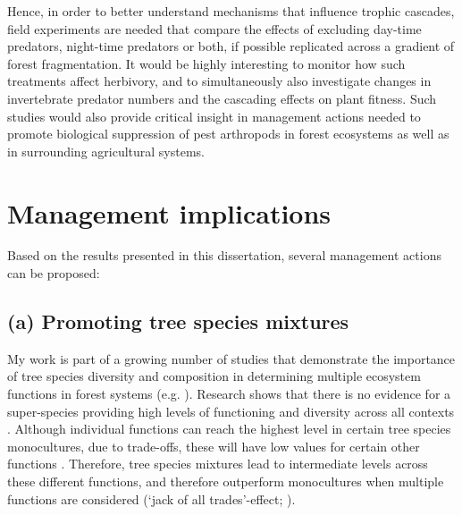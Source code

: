 \documentclass[10pt, twoside]{book} %
\begin{document}
Hence, in order to better understand mechanisms that influence trophic cascades, field experiments are needed that compare the effects of excluding day-time predators, night-time predators or both, if possible replicated across a gradient of forest fragmentation. It would be highly interesting to monitor how such treatments affect herbivory, and to simultaneously  also investigate changes in invertebrate predator numbers and the cascading effects on plant fitness. Such studies would also provide critical insight in management actions needed to promote biological suppression of pest arthropods in forest ecosystems as well as in surrounding agricultural systems.\\


	\section{Management implications}
	
	Based on the results presented in this dissertation, several management actions can be proposed:\\
	\subsection*{(a) Promoting tree species mixtures}
	
	My work is part of a growing number of studies that demonstrate the importance of tree species diversity and composition in determining multiple ecosystem functions in forest systems (e.g. \citealt{Gamfeldt2013, VanderPlas2016, Ratcliffe2017, Baeten2019, Hertzog2019}). Research shows that there is no evidence for a super-species providing high levels of functioning and diversity across all contexts \citep{VanderPlas2016}. Although individual functions can reach the highest level in certain tree species monocultures, due to trade-offs, these will have low values for certain other functions \citep{Gamfeldt2013, VanderPlas2016, Hertzog2020}. Therefore, tree species mixtures lead to intermediate levels across these different functions, and therefore outperform monocultures when multiple functions are considered (`jack of all trades'-effect; \citealt{VanderPlas2016}).\\
	
\end{document}
